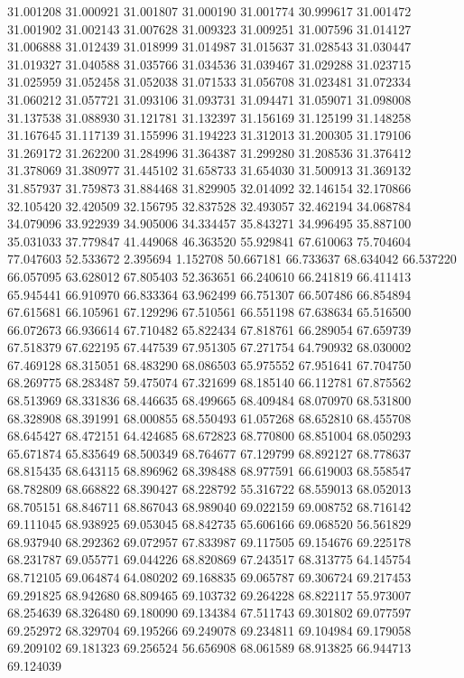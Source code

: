 31.001208
31.000921
31.001807
31.000190
31.001774
30.999617
31.001472
31.001902
31.002143
31.007628
31.009323
31.009251
31.007596
31.014127
31.006888
31.012439
31.018999
31.014987
31.015637
31.028543
31.030447
31.019327
31.040588
31.035766
31.034536
31.039467
31.029288
31.023715
31.025959
31.052458
31.052038
31.071533
31.056708
31.023481
31.072334
31.060212
31.057721
31.093106
31.093731
31.094471
31.059071
31.098008
31.137538
31.088930
31.121781
31.132397
31.156169
31.125199
31.148258
31.167645
31.117139
31.155996
31.194223
31.312013
31.200305
31.179106
31.269172
31.262200
31.284996
31.364387
31.299280
31.208536
31.376412
31.378069
31.380977
31.445102
31.658733
31.654030
31.500913
31.369132
31.857937
31.759873
31.884468
31.829905
32.014092
32.146154
32.170866
32.105420
32.420509
32.156795
32.837528
32.493057
32.462194
34.068784
34.079096
33.922939
34.905006
34.334457
35.843271
34.996495
35.887100
35.031033
37.779847
41.449068
46.363520
55.929841
67.610063
75.704604
77.047603
52.533672
2.395694
1.152708
50.667181
66.733637
68.634042
66.537220
66.057095
63.628012
67.805403
52.363651
66.240610
66.241819
66.411413
65.945441
66.910970
66.833364
63.962499
66.751307
66.507486
66.854894
67.615681
66.105961
67.129296
67.510561
66.551198
67.638634
65.516500
66.072673
66.936614
67.710482
65.822434
67.818761
66.289054
67.659739
67.518379
67.622195
67.447539
67.951305
67.271754
64.790932
68.030002
67.469128
68.315051
68.483290
68.086503
65.975552
67.951641
67.704750
68.269775
68.283487
59.475074
67.321699
68.185140
66.112781
67.875562
68.513969
68.331836
68.446635
68.499665
68.409484
68.070970
68.531800
68.328908
68.391991
68.000855
68.550493
61.057268
68.652810
68.455708
68.645427
68.472151
64.424685
68.672823
68.770800
68.851004
68.050293
65.671874
65.835649
68.500349
68.764677
67.129799
68.892127
68.778637
68.815435
68.643115
68.896962
68.398488
68.977591
66.619003
68.558547
68.782809
68.668822
68.390427
68.228792
55.316722
68.559013
68.052013
68.705151
68.846711
68.867043
68.989040
69.022159
69.008752
68.716142
69.111045
68.938925
69.053045
68.842735
65.606166
69.068520
56.561829
68.937940
68.292362
69.072957
67.833987
69.117505
69.154676
69.225178
68.231787
69.055771
69.044226
68.820869
67.243517
68.313775
64.145754
68.712105
69.064874
64.080202
69.168835
69.065787
69.306724
69.217453
69.291825
68.942680
68.809465
69.103732
69.264228
68.822117
55.973007
68.254639
68.326480
69.180090
69.134384
67.511743
69.301802
69.077597
69.252972
68.329704
69.195266
69.249078
69.234811
69.104984
69.179058
69.209102
69.181323
69.256524
56.656908
68.061589
68.913825
66.944713
69.124039
